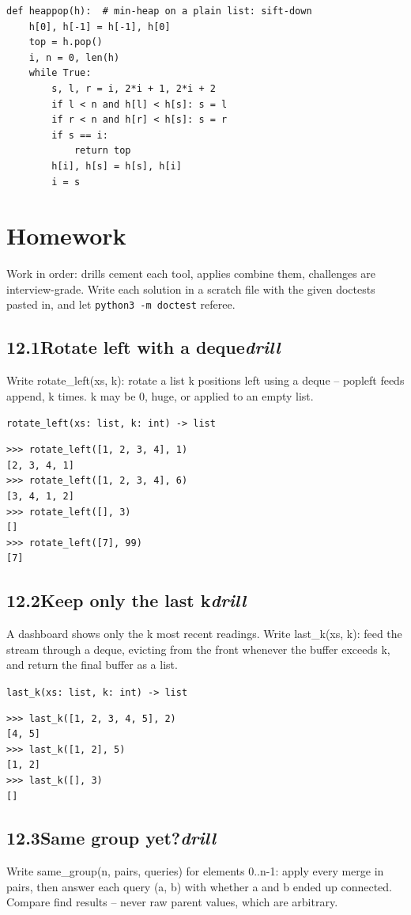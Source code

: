 \documentclass[10pt,letterpaper]{book}
\begin{document}
\begin{lstlisting}[style=ex]
def heappop(h):  # min-heap on a plain list: sift-down
    h[0], h[-1] = h[-1], h[0]
    top = h.pop()
    i, n = 0, len(h)
    while True:
        s, l, r = i, 2*i + 1, 2*i + 2
        if l < n and h[l] < h[s]: s = l
        if r < n and h[r] < h[s]: s = r
        if s == i:
            return top
        h[i], h[s] = h[s], h[i]
        i = s
\end{lstlisting}

\section{Homework}
Work in order: drills cement each tool, applies combine them,
challenges are interview-grade. Write each solution in a scratch file with
the given doctests pasted in, and let \texttt{python3 -m doctest} referee.
\subsection*{12.1\quad Rotate left with a deque\hfill\textnormal{\textit{drill}}}
Write rotate\_left(xs, k): rotate a list k positions left using a deque -- popleft feeds append, k times. k may be 0, huge, or applied to an empty list.

\noindent\texttt{rotate\_left(xs: list, k: int) -> list}
\begin{lstlisting}[style=ex]
>>> rotate_left([1, 2, 3, 4], 1)
[2, 3, 4, 1]
>>> rotate_left([1, 2, 3, 4], 6)
[3, 4, 1, 2]
>>> rotate_left([], 3)
[]
>>> rotate_left([7], 99)
[7]
\end{lstlisting}
\subsection*{12.2\quad Keep only the last k\hfill\textnormal{\textit{drill}}}
A dashboard shows only the k most recent readings. Write last\_k(xs, k): feed the stream through a deque, evicting from the front whenever the buffer exceeds k, and return the final buffer as a list.

\noindent\texttt{last\_k(xs: list, k: int) -> list}
\begin{lstlisting}[style=ex]
>>> last_k([1, 2, 3, 4, 5], 2)
[4, 5]
>>> last_k([1, 2], 5)
[1, 2]
>>> last_k([], 3)
[]
\end{lstlisting}
\subsection*{12.3\quad Same group yet?\hfill\textnormal{\textit{drill}}}
Write same\_group(n, pairs, queries) for elements 0..n-1: apply every merge in pairs, then answer each query (a, b) with whether a and b ended up connected. Compare find results -- never raw parent values, which are arbitrary.
\end{document}
